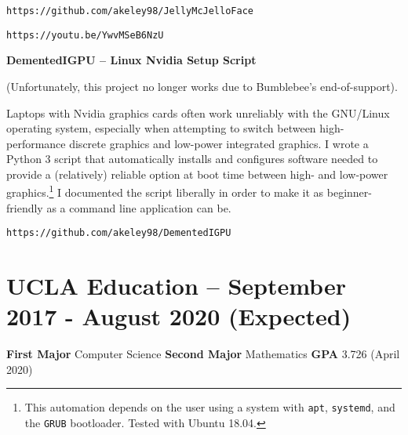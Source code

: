 \documentclass[11pt]{article}
\begin{document}
\quad\texttt{https://github.com/akeley98/JellyMcJelloFace}

\quad\texttt{https://youtu.be/YwvMSeB6NzU}

\textbf{DementedIGPU -- Linux Nvidia Setup Script}

(Unfortunately, this project no longer works due to Bumblebee's
end-of-support).

Laptops with Nvidia graphics cards often work unreliably with the
GNU/Linux operating system, especially when attempting to switch
between high-performance discrete graphics and low-power integrated
graphics. I wrote a Python 3 script that automatically installs and
configures software needed to provide a (relatively) reliable option
at boot time between high- and low-power graphics.\footnote{This
  automation depends on the user using a system with \texttt{apt},
  \texttt{systemd}, and the \texttt{GRUB} bootloader. Tested with
  Ubuntu 18.04.} I documented the script liberally in order to make it
as beginner-friendly as a command line application can be.

\quad\texttt{https://github.com/akeley98/DementedIGPU}

\newpage
\section{UCLA Education -- September 2017 - August 2020 (Expected)}

\textbf{First Major} Computer Science \hfill\textbf{Second Major}
Mathematics \hfill\textbf{GPA} 3.726 (April 2020) %


\end{document}
